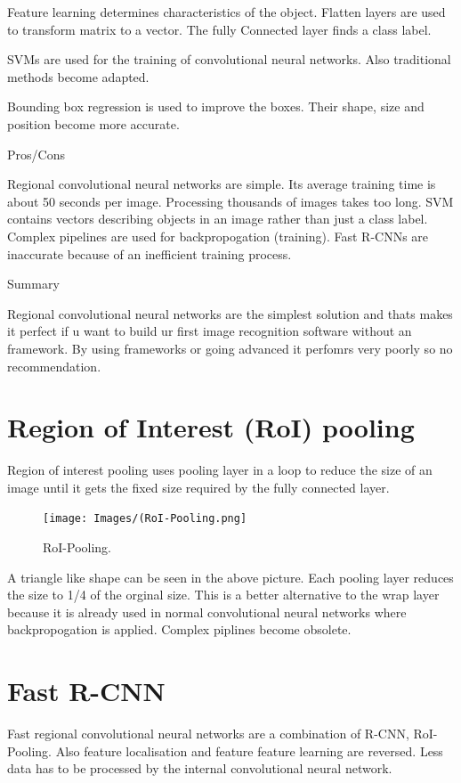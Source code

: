 \documentclass[a4paper,13pt,twoside]{book}
\begin{document}
Feature learning determines characteristics of the object. Flatten layers are used to transform matrix to a vector. The fully Connected layer finds a class label.

SVMs are used for the training of convolutional neural networks. Also traditional methods become adapted.

Bounding box regression is used to improve the boxes. Their shape, size and position become more accurate.

Pros/Cons

Regional convolutional neural networks are simple. Its average training time is about 50 seconds per image. Processing thousands of images takes too long. SVM contains vectors describing objects in an image rather than just a class label. Complex pipelines are used for backpropogation (training).
Fast R-CNNs are inaccurate because of an inefficient training process.

Summary

Regional convolutional neural networks are the simplest solution and thats makes it perfect if u want to build ur first image recognition software without an framework. By using frameworks or going advanced it perfomrs very poorly so no recommendation.

\section{Region of Interest (RoI) pooling}

Region of interest pooling uses pooling layer in a loop to reduce the size of an image until it gets the fixed size required by the fully connected layer.

\begin{figure}[H]
  \texttt{[image: Images/(RoI-Pooling.png]}
  \caption{RoI-Pooling.}
  \label{fig:RoI-Pooling}
\end{figure}

A triangle like shape can be seen in the above picture. Each pooling layer reduces the size to 1/4 of the orginal size.
This is a better alternative to the wrap layer because it is already used in normal convolutional neural networks where backpropogation is applied. Complex piplines become obsolete.

\section{Fast R-CNN}

Fast regional convolutional neural networks are a combination of R-CNN, RoI-Pooling. Also feature localisation and feature feature learning are reversed. Less data has to be processed by the internal convolutional neural network.
\end{document}
